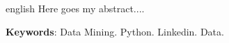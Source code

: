 \begin{resumo}[ABSTRACT]
 \begin{otherlanguage*}{english}
   Here goes my abstract....
   
   
   \vspace{\onelineskip}
 
   \noindent 
   \textbf{Keywords}: Data Mining. Python. Linkedin. Data. 
 \end{otherlanguage*}
\end{resumo}
